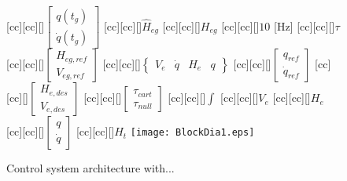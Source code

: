 \begin{figure}
[cc][cc][\FontFigM]{\tiny{$\begin{bmatrix}q(t_g)\\ \dot{q}(t_g)\end{bmatrix}$}}
[cc][cc][\FontFigM]{\tiny{$\hat{H}_{eg}$}}
[cc][cc][\FontFigM]{\tiny{$H_{eg}$}}
[cc][cc][\FontFigM]{\tiny{$10$ [Hz]}}
[cc][cc][\FontFigM]{\tiny{$\tau$}}
[cc][cc][\FontFigM]{\tiny{$\begin{bmatrix}H_{eg,ref}\\ V_{eg,ref}\end{bmatrix}$}}
[cc][cc][\FontFigM]{\tiny{$\begin{Bmatrix}V_{e} & \dot{q} & H_{e} & q\end{Bmatrix}$}}
[cc][cc][\FontFigM]{\tiny{$\begin{bmatrix}q_{ref}\\ \dot{q}_{ref}\end{bmatrix}$}}
[cc][cc][\FontFigM]{\tiny{$\begin{bmatrix}H_{e,des}\\ V_{e,des}\end{bmatrix}$}}
[cc][cc][\FontFigM]{\tiny{$\begin{bmatrix}\tau_{cart}\\ \tau_{null}\end{bmatrix}$}}
[cc][cc][\FontFigM]{$\int$}
[cc][cc][\FontFigM]{\tiny{$V_e$}}
[cc][cc][\FontFigM]{\tiny{$H_e$}}
[cc][cc][\FontFigM]{\tiny{$\begin{bmatrix}q\\ \dot{q}\end{bmatrix}$}}
[cc][cc][\FontFigM]{\tiny{$H_t$}}
\centering\texttt{[image: BlockDia1.eps]}


\caption{Control system architecture with...}
\label{fig:blockdiagram}
\end{figure}
%
%
%
